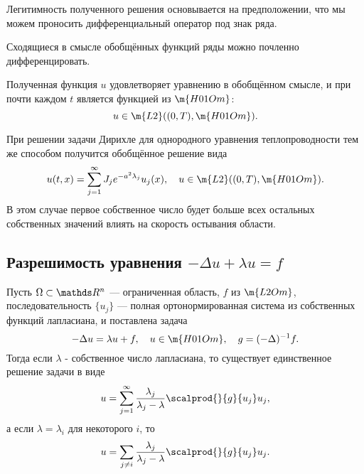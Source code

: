 \begin{note}
Легитимность полученного решения основывается на предположении, что мы можем проносить дифференциальный оператор под знак ряда.
\end{note}

\begin{lemma} Сходящиеся в смысле обобщённых функций ряды можно почленно дифференцировать.
\end{lemma}

\begin{corollary}
Полученная функция $u$ удовлетворяет уравнению в обобщённом смысле, и при почти каждом $t$ является функцией из $\m{H01Om}$:
$$ u \in \m{L2}((0,T), \m{H01Om}).$$
\end{corollary}

\begin{note}
При решении задачи Дирихле для однородного уравнения теплопроводности тем же способом получится обобщённое решение вида
$$u(t,x) = \sum_{j=1}^\infty J_j e^{-a^2 \lambda_j} u_j(x), \quad u \in \m{L2}((0,T), \m{H01Om}).$$
В этом случае первое собственное число будет больше всех остальных собственных значений влиять на скорость остывания области.
\end{note}

\subsection{Разрешимость уравнения $− \Delta u + \lambda u = f$}
\begin{theorem} Пусть $\Omega \subset \real^n$ --- ограниченная область, $f$ из $\m{L2Om}$, последовательность $\{ u_j \}$ --- полная ортонормированная система из собственных функций лапласиана, и поставлена задача
$$ - \Delta u = \lambda u + f, \quad u \in \m{H01Om}, \quad g = (-\Delta)^{-1} f.$$
Тогда если $\lambda$ - собственное число лапласиана, то существует единственное решение задачи в виде
$$ u = \sum_{j=1}^\infty \frac{\lambda_j}{\lambda_j - \lambda} \scalprod{}{g}{u_j} u_j,$$
а если $\lambda = \lambda_i$ для некоторого $i$, то
$$ u = \sum_{j \neq i} \frac {\lambda_j} {\lambda_j - \lambda} \scalprod{}{g}{u_j} u_j.$$
\end{theorem}

